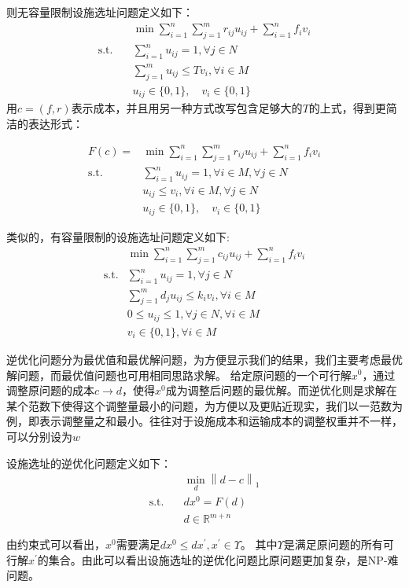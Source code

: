 \documentclass[UTF8]{article}
\begin{document}
则无容量限制设施选址问题定义如下：
\begin{align*}
&\min \sum_{i=1}^n \sum_{j=1}^m r_{ij}u_{ij} + \sum_{i=1}^n f_i v_i \\
\text{s.t.}\quad & \sum_{i=1}^n u_{ij} =1, \forall j \in N  \\
&\sum_{j=1}^m u_{ij}  \leq Tv_i, \forall i \in M \\
& u_{ij} \in \{0,1\}, \quad v_{i} \in \{0,1\}
\end{align*}
用$c=(f,r)$表示成本，并且用另一种方式改写包含足够大的$T$的上式，得到更简洁的表达形式：

\begin{align*}
F(c) = &\min \sum_{i=1}^n \sum_{j=1}^m r_{ij}u_{ij} + \sum_{i=1}^n f_i v_i \\
\text{s.t.}\quad & \sum_{i=1}^n u_{ij} =1,\forall i \in M, \forall j \in N  \\
& u_{ij}  \leq v_i, \forall i \in M ,\forall j \in N\\
& u_{ij} \in \{0,1\}, \quad v_{i} \in \{0,1\}
\end{align*}

类似的，有容量限制的设施选址问题定义如下:
\begin{align*}
&\min \sum_{i=1}^n \sum_{j=1}^m c_{ij}u_{ij} + \sum_{i=1}^n f_i v_i \\
\text{s.t.}& \sum_{i=1}^n u_{ij} =1, \forall j \in N  \\
&\sum_{j=1}^m d_j u_{ij}  \leq k_iv_i, \forall i \in M \\
& 0 \leq u_{ij} \leq 1,\forall j \in N, \forall i \in M \\
& v_{i} \in \{0,1\}, \forall i \in M
\end{align*}

逆优化问题分为最优值和最优解问题，为方便显示我们的结果，我们主要考虑最优解问题，而最优值问题也可用相同思路求解。
给定原问题的一个可行解$x^0$，通过调整原问题的成本$c \to d$，使得$x^0$成为调整后问题的最优解。而逆优化则是求解在某个范数下使得这个调整量最小的问题，为方便以及更贴近现实，我们以一范数为例，即表示调整量之和最小。往往对于设施成本和运输成本的调整权重并不一样，可以分别设为$w$

设施选址的逆优化问题定义如下：
\begin{align*}
&\min_{d} \left\|d-c\right\|_1 \\
\text{s.t.}\quad & dx^0 = F(d)   \\
& d \in \mathbb{R}^{m+n}
\end{align*}

由约束式可以看出，$x^0$需要满足$dx^0 \leq dx^{'}, x^{'} \in \Upsilon$。 其中$\Upsilon$是满足原问题的所有可行解$x^{'}$的集合。由此可以看出设施选址的逆优化问题比原问题更加复杂，是NP-难问题。
\end{document}
